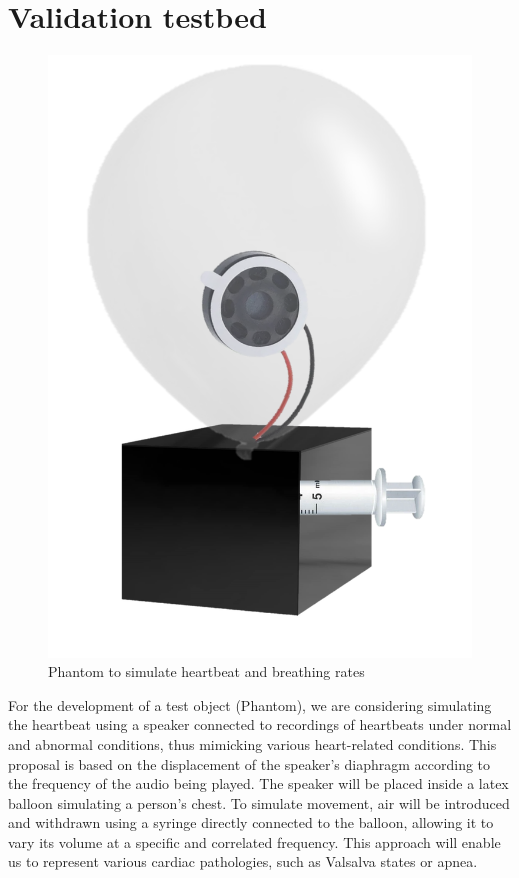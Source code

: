 \documentclass[lettersize,journal]{IEEEtran}
\begin{document}
\section{Validation testbed}

\begin{figure}[H]
    \centering
    \includegraphics[scale=0.27]{figs/Phantom.png}
    \caption{Phantom to simulate heartbeat and breathing rates}
    \label{fig:phantom}
\end{figure}

For the development of a test object (Phantom), we are considering simulating the heartbeat using a speaker connected to recordings of heartbeats under normal and abnormal conditions, thus mimicking various heart-related conditions. This proposal is based on the displacement of the speaker's diaphragm according to the frequency of the audio being played. The speaker will be placed inside a latex balloon simulating a person's chest. To simulate movement, air will be introduced and withdrawn using a syringe directly connected to the balloon, allowing it to vary its volume at a specific and correlated frequency. This approach will enable us to represent various cardiac pathologies, such as Valsalva states or apnea.
\end{document}
